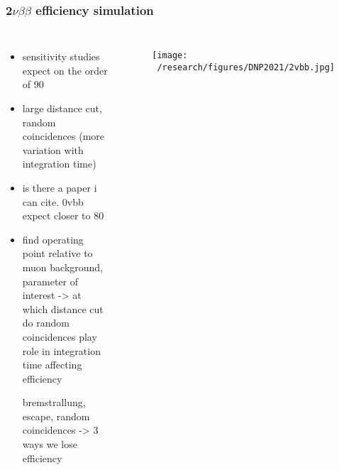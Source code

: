 \documentclass{beamer}
\begin{document}


	\begin{frame}
		\frametitle{2$\nu\beta\beta$ efficiency simulation}
		\begin{columns}[c] %
			
			\begin{itemize}
				\item sensitivity studies expect on the order of 90%
				\item large distance cut, random coincidences (more variation with integration time)
				\item is there a paper i can cite. 0vbb expect closer to 80%
				
				\item find operating point relative to muon background, parameter of interest -> at which distance cut do random coincidences play role in integration time affecting efficiency
				
				bremstrallung, escape, random coincidences -> 3 ways we lose efficiency
			\end{itemize}
			
			\begin{figure}
			\texttt{[image: ~/research/figures/DNP2021/2vbb.jpg]}
			\end{figure}
			
		\end{columns}
	\end{frame}


\end{document}
